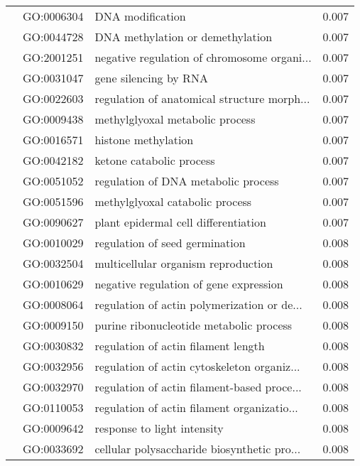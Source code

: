 \begin{longtable}{lllr}
   & GO:0006304 &                             DNA modification &         0.007 \\
   & GO:0044728 &             DNA methylation or demethylation &         0.007 \\
   & GO:2001251 &  negative regulation of chromosome organi... &         0.007 \\
   & GO:0031047 &                        gene silencing by RNA &         0.007 \\
   & GO:0022603 &  regulation of anatomical structure morph... &         0.007 \\
   & GO:0009438 &              methylglyoxal metabolic process &         0.007 \\
   & GO:0016571 &                          histone methylation &         0.007 \\
   & GO:0042182 &                     ketone catabolic process &         0.007 \\
   & GO:0051052 &          regulation of DNA metabolic process &         0.007 \\
   & GO:0051596 &              methylglyoxal catabolic process &         0.007 \\
   & GO:0090627 &         plant epidermal cell differentiation &         0.007 \\
   & GO:0010029 &               regulation of seed germination &         0.008 \\
   & GO:0032504 &          multicellular organism reproduction &         0.008 \\
   & GO:0010629 &       negative regulation of gene expression &         0.008 \\
   & GO:0008064 &  regulation of actin polymerization or de... &         0.008 \\
   & GO:0009150 &      purine ribonucleotide metabolic process &         0.008 \\
   & GO:0030832 &          regulation of actin filament length &         0.008 \\
   & GO:0032956 &  regulation of actin cytoskeleton organiz... &         0.008 \\
   & GO:0032970 &  regulation of actin filament-based proce... &         0.008 \\
   & GO:0110053 &  regulation of actin filament organizatio... &         0.008 \\
   & GO:0009642 &                  response to light intensity &         0.008 \\
   & GO:0033692 &  cellular polysaccharide biosynthetic pro... &         0.008 \\

\end{longtable}
